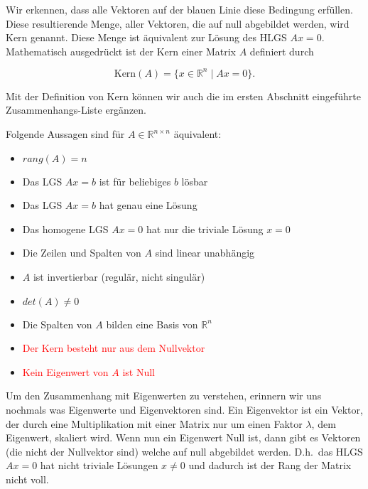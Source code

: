 Wir erkennen, dass alle Vektoren auf der blauen Linie diese Bedingung erfüllen. Diese resultierende Menge, aller Vektoren, die auf null abgebildet werden, wird Kern genannt. Diese Menge ist äquivalent zur Lösung des HLGS \( Ax = 0 \). Mathematisch ausgedrückt ist der Kern einer Matrix \( A \) definiert durch

\begin{equation*}
    \text{Kern}(A) = \{ x \in \mathbb{R}^n \mid Ax = 0 \}.
\end{equation*}

Mit der Definition von Kern können wir auch die im ersten Abschnitt eingeführte Zusammenhangs-Liste ergänzen. 

\begin{tcolorbox}[colback=gray!30, colframe=gray!80, title=Wichtige Zusammenhänge]
    Folgende Aussagen sind für \( A \in \mathbb{R}^{n \times n} \) äquivalent:
    \begin{itemize}
        \item \(rang (A) = n \)
        \item Das LGS \( Ax=b \) ist für beliebiges \( b \) lösbar
        \item Das LGS \( Ax=b \) hat genau eine Lösung
        \item Das homogene LGS \( Ax=0 \) hat nur die triviale Lösung \( x = 0 \)
        \item Die Zeilen und Spalten von \( A \) sind linear unabhängig
        \item \( A \) ist invertierbar (regulär, nicht singulär)
        \item \( det(A) \neq 0 \)
        \item Die Spalten von \( A \) bilden eine Basis von \( \mathbb{R}^n \)
        \item \textcolor{red}{Der Kern besteht nur aus dem Nullvektor}
        \item \textcolor{red}{Kein Eigenwert von \( A \) ist Null}
    \end{itemize}
\end{tcolorbox}

\vspace{0.5\baselineskip}

Um den Zusammenhang mit Eigenwerten zu verstehen, erinnern wir uns nochmals was Eigenwerte und Eigenvektoren sind. Ein Eigenvektor ist ein Vektor, der durch eine Multiplikation mit einer Matrix nur um einen Faktor \( \lambda \), dem Eigenwert, skaliert wird. Wenn nun ein Eigenwert Null ist, dann gibt es Vektoren (die nicht der Nullvektor sind) welche auf null abgebildet werden. D.h.\ das HLGS \( Ax = 0 \) hat nicht triviale Lösungen \( x \neq 0 \) und dadurch ist der Rang der Matrix nicht voll.

